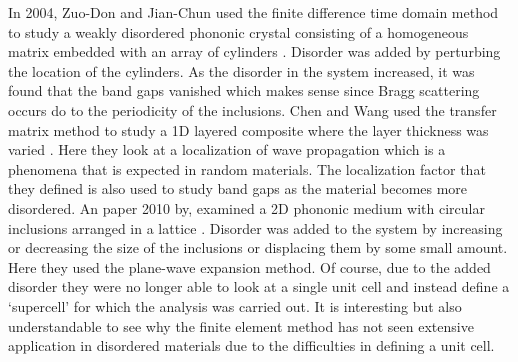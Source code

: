 \documentclass{article}
\begin{document}
In 2004, Zuo-Don and Jian-Chun used the finite difference time domain method to 
study a weakly disordered phononic crystal consisting of a homogeneous matrix 
embedded with an array of cylinders \cite{zuodon04}. Disorder was added by 
perturbing the location of the cylinders. As the disorder in the system 
increased, it was found that the band gaps vanished which makes sense since
Bragg scattering occurs do to the periodicity of the inclusions. Chen and Wang 
used the transfer matrix method to study a 1D layered composite where the layer 
thickness was varied \cite{chen07}. Here they look at a localization of wave 
propagation which is a phenomena that is expected in random materials. The 
localization factor that they defined is also used to study band gaps as the 
material becomes more disordered. An paper 2010 by, examined a 2D phononic 
medium with circular inclusions arranged in a lattice \cite{wang10}. Disorder 
was added to the system by increasing or decreasing the size of the inclusions 
or displacing them by some small amount. Here they used the plane-wave 
expansion method. Of course, due to the added disorder they were no longer able 
to look at a single unit cell and instead define a `supercell' for which the 
analysis was carried out. It is interesting but also understandable to see why 
the finite element method has not seen extensive application in disordered 
materials due to the difficulties in defining a unit cell.

\end{document}
